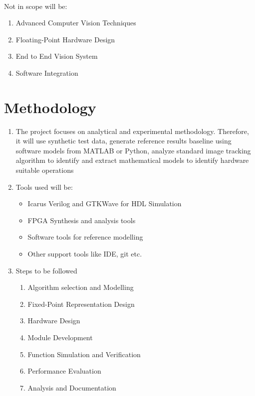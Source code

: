 \documentclass[10pt,a4paper]{article}
\begin{document}
\\

\noindent Not in scope will be:
\begin{enumerate}
    \item Advanced Computer Vision Techniques
    \item Floating-Point Hardware Design
    \item End to End Vision System
    \item Software Integration
\end{enumerate}


\section*{Methodology}
\begin{enumerate}
    \item The project focuses on analytical and experimental methodology. Therefore, it will use synthetic test data, generate reference results baseline using 
    software models from MATLAB or Python, analyze standard image tracking algorithm to identify and extract mathematical models to identify hardware suitable operations 

    \item Tools used will be:
    \begin{itemize}
        \item Icarus Verilog and GTKWave for HDL Simulation
        \item FPGA Synthesis and analysis tools
        \item Software tools for reference modelling
        \item Other support tools like IDE, git etc.
    \end{itemize}

    \item Steps to be followed
        \begin{enumerate}
            \item Algorithm selection and Modelling
            \item Fixed-Point Representation Design
            \item Hardware Design
            \item Module Development
            \item Function Simulation and Verification
            \item Performance Evaluation
            \item Analysis and Documentation
        \end{enumerate}
\end{enumerate}
\end{document}
